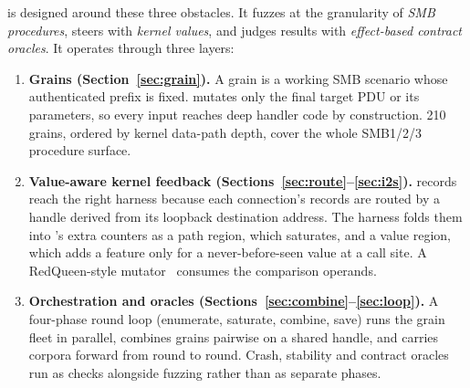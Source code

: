 \documentclass{article}
\begin{document}
\medskip
\toolname is designed around these three obstacles. It fuzzes at the
granularity of \emph{SMB procedures}, steers with \emph{kernel values}, and
judges results with \emph{effect-based contract oracles}. It operates through
three layers:
\begin{enumerate}[nosep]
  \item \textbf{Grains (Section~\ref{sec:grain}).} A grain is a working SMB
        scenario whose authenticated prefix is fixed. \libfuzzer mutates only
        the final target PDU or its parameters, so every input reaches deep
        handler code by construction. 210 grains, ordered by kernel data-path
        depth, cover the whole SMB1/2/3 procedure surface.
  \item \textbf{Value-aware kernel feedback
        (Sections~\ref{sec:route}--\ref{sec:i2s}).} \kcovdf records reach the
        right harness because each connection's records are routed by a
        handle derived from its loopback destination address. The harness
        folds them into \libfuzzer's extra counters as a path region, which
        saturates, and a value region, which adds a feature only for a
        never-before-seen value at a call site. A RedQueen-style
        mutator~\cite{aschermann2019redqueen} consumes the comparison
        operands.
  \item \textbf{Orchestration and oracles
        (Sections~\ref{sec:combine}--\ref{sec:loop}).} A four-phase round loop
        (enumerate, saturate, combine, save) runs the grain fleet in parallel,
        combines grains pairwise on a shared handle, and carries corpora
        forward from round to round. Crash, stability and contract oracles run
        as checks alongside fuzzing rather than as separate phases.
\end{enumerate}
\end{document}
